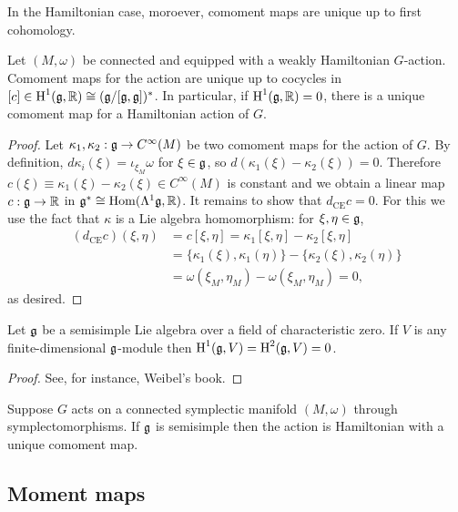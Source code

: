 \documentclass{amsart}
\begin{document}
In the Hamiltonian case, moroever, comoment maps are unique up to first cohomology.
\begin{proposition}
    Let $(M,\omega)$ be connected and equipped with a weakly Hamiltonian $G$-action.
    Comoment maps for the action are unique up to cocycles in $[c]\in\operatorname{H}^1(\mathfrak g,\mathbb{R})\cong(\mathfrak g/[\mathfrak g,\mathfrak g])^*$.
    In particular, if $\operatorname{H}^1(\mathfrak g,\mathbb{R})=0$, there is a unique comoment map for a Hamiltonian
    action of $G$.
    \label{prop:comomentunique}
\end{proposition}
\begin{proof}
    Let $\kappa_1,\kappa_2:\mathfrak g\to C^\infty(M)$ be two comoment maps for the action of $G$.
    By definition, $d\kappa_i(\xi)=\iota_{\xi_M}\omega$ for $\xi\in\mathfrak g$, so $d(\kappa_1(\xi)-\kappa_2(\xi)) = 0$.
    Therefore $c(\xi)\equiv\kappa_1(\xi)-\kappa_2(\xi)\in C^\infty(M)$ is constant and we
    obtain a linear map $c:\mathfrak g\to\mathbb{R}$ in $\mathfrak g^*\cong \operatorname{Hom}(\Lambda^1\mathfrak g,\mathbb{R})$. It remains to show
    that $d_\textrm{CE}c=0$. For this we use the fact that $\kappa$ is a Lie algebra homomorphism:
    for $\xi,\eta\in\mathfrak g$,
    \begin{align*}
        (d_\textrm{CE}c)(\xi,\eta) &= c[\xi,\eta] = \kappa_1[\xi,\eta] - \kappa_2[\xi,\eta]\\
        &= \{\kappa_1(\xi),\kappa_1(\eta)\} - \{\kappa_2(\xi),\kappa_2(\eta)\}\\
        &= \omega(\xi_M,\eta_M) - \omega(\xi_M,\eta_M) = 0,
    \end{align*}
    as desired.
\end{proof}

\begin{theorem}
    Let $\mathfrak g$ be a semisimple Lie algebra over a field of characteristic zero. If $V$
    is any finite-dimensional $\mathfrak g$-module then $\operatorname{H}^1(\mathfrak g,V) = \operatorname{H}^2(\mathfrak g,V)=0$.
\end{theorem}
\begin{proof}
    See, for instance, Weibel's book.
\end{proof}

\begin{corollary}
    Suppose $G$ acts on a connected symplectic manifold $(M,\omega)$ through symplectomorphisms.
    If $\mathfrak g$ is semisimple then the action is Hamiltonian with a unique comoment map.
\end{corollary}


\subsection{Moment maps}
\end{document}
